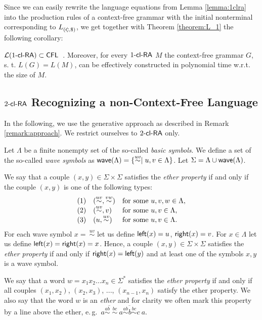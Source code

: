 Since we can easily rewrite the language equations from Lemma \ref{lemma:1clra}
into the production rules of a context-free grammar with the initial nonterminal corresponding to $L_{({\small \cent},\$)}$,
we get together with Theorem \ref{theorem:L_1} the following corollary:

\begin{corollary}\label{corollary:1clra_cfl}
$\calL{\kclRA[1]} \subset \CFL$\ . Moreover, for every $\kclRA[1]$ $M$ the context-free grammar $G$, s. t. $L(G) = L(M)$, can be effectively constructed in polynomial time w.r.t. the size of $M$.
\end{corollary}

\subsection{$\kclRA[2]$ Recognizing a non-Context-Free Language}\label{2clRA-non-CFL}

In the following, we use the generative approach as described in Remark \ref{remark:approach}. We restrict ourselves to $\kclRA[2]$ only.

\begin{definition}\label{definition:ether}
Let $\Lambda$ be a finite nonempty set of the so-called \emph{basic symbols}. We define a set of the so-called \emph{wave symbols} as $\wave(\Lambda) = \{\stackrel{uv}{\sim} \mid u,v \in \Lambda\}$. Let $\Sigma = \Lambda \cup \wave(\Lambda)$.

We say that a couple $(x, y) \in \Sigma \times \Sigma$ satisfies the \emph{ether property} if and only if the couple $(x, y)$ is one of the following types:
$$
\begin{array}{ll}
(1) \quad (\stackrel{uv}{\sim}, \stackrel{vw}{\sim}) 	& \textup{for some } u, v, w \in \Lambda,\\
(2) \quad (\stackrel{uv}{\sim}, v)					& \textup{for some } u, v \in \Lambda,\\
(3) \quad (u, \stackrel{uv}{\sim})					& \textup{for some } u, v \in \Lambda.
\end{array}
$$
For each wave symbol $x =\ \stackrel{uv}{\sim}$ let us define ${\sf left}(x) = u$, ${\sf right}(x) = v$. For $x \in \Lambda$ let us define ${\sf left}(x) = {\sf right}(x) = x$. Hence, a couple $(x, y) \in \Sigma \times \Sigma$ satisfies the \emph{ether property} if and only if ${\sf right}(x) = {\sf left}(y)$ and at least one of the symbols $x, y$ is a wave symbol.

We say that a word $w = x_1 x_2 \ldots x_n \in \Sigma^*$ satisfies the \emph{ether property} if and only if all couples $(x_1, x_2)$, $(x_2, x_3)$, ..., $(x_{n-1}, x_n)$ satisfy the ether property. We also say that the word $w$ is an \emph{ether} and for clarity we often mark this property by a line above the ether, e.\,g.\ $\overline{a \stackrel{ab}{\sim} \; \stackrel{bc}{\sim}}\ \overline{a \stackrel{ab}{\sim} b \stackrel{bc}{\sim} c}\ a$.
\end{definition}

